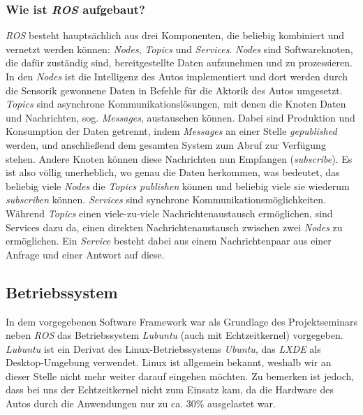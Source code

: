 \subsubsection{Wie ist \textit{ROS} aufgebaut?}
\textit{ROS} besteht hauptsächlich aus drei Komponenten, die beliebig kombiniert und vernetzt werden können: \textit{Nodes}, \textit{Topics} und \textit{Services}. \textit{Nodes} sind Softwareknoten, die dafür zuständig sind, bereitgestellte Daten aufzunehmen und zu prozessieren. In den \textit{Nodes} ist die Intelligenz des Autos implementiert und dort werden durch die Sensorik gewonnene Daten in Befehle für die Aktorik des Autos umgesetzt. 
\textit{Topics} sind asynchrone Kommunikationslösungen, mit denen die Knoten Daten und Nachrichten, sog. \textit{Messages}, austauschen können. Dabei sind Produktion und Konsumption der Daten getrennt, indem \textit{Messages} an einer Stelle \textit{gepublished} werden, und anschließend dem gesamten System zum Abruf zur Verfügung stehen. Andere Knoten können diese Nachrichten nun Empfangen (\textit{subscribe}). Es ist also völlig unerheblich, wo genau die Daten herkommen, was bedeutet, das beliebig viele \textit{Nodes} die \textit{Topics publishen} können und beliebig viele sie wiederum \textit{subscriben} können. 
\textit{Services} sind synchrone Kommunikationsmöglichkeiten. Während \textit{Topics} einen viele-zu-viele Nachrichtenaustausch ermöglichen, sind Services dazu da, einen direkten Nachrichtenaustausch zwischen zwei \textit{Nodes} zu ermöglichen. Ein \textit{Service} besteht dabei aus einem Nachrichtenpaar aus einer Anfrage und einer Antwort auf diese. 

\subsection{Betriebssystem}
In dem vorgegebenen Software Framework war als Grundlage des Projektseminars neben \textit{ROS} das Betriebssystem \textit{Lubuntu} (auch mit Echtzeitkernel) vorgegeben. \textit{Lubuntu} ist ein Derivat des Linux-Betriebssystems \textit{Ubuntu}, das \textit{LXDE} als Desktop-Umgebung verwendet. Linux ist allgemein bekannt, weshalb wir an dieser Stelle nicht mehr weiter darauf eingehen möchten. 
Zu bemerken ist jedoch, dass bei uns der Echtzeitkernel nicht zum Einsatz kam, da die Hardware des Autos durch die Anwendungen nur zu ca. 30\% ausgelastet war. 

